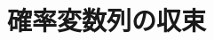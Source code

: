 \documentclass[a4j,11pt]{jarticle}
\theoremstyle{definition}
\newtheorem{lemma}[theorem]{補題}
\begin{document}
\section{確率変数列の収束}
\begin{comment} %
\begin{lemma}
  確率変数列列
  $(X_n)_{n=1}^{\infty}$
  が
  確率変数
  $X$
  に法則収束することと、分布関数列
  $(F_{X_n})_{n=1}^{\infty}$
  が
  $F_X$
  に各点収束することは同値である。
\end{lemma}
\begin{proof}
  (1)必要性

  $(X_n)_{n=1}^{\infty}$
  が
  $X$
  に法則収束すると仮定する。
  $\mathbb{E}[f(X)] = \int_{\mathbb{R}}f(x) P_X(dx)$
  となるので、
  $\lim_{n\to\infty} \int_{\mathbb{R}} f(x) P_{X_n}(dx) = \int_{\mathbb{R}} f(x) P_X(dx)$
  となる。
  $A \in \mathcal{O}(\mathbb{R})$
  とすると、
  $g_k \in C_b(\mathbb{R}) \nearrow 1_A$
  となる関数列
  $(g_k)_{k=1}^{\infty}$
  が存在する。
  $\int_{\mathbb{R}} 1_A(x) P_{X_n}(dx) = P_{X_n}(A) \geq \int_{\mathbb{R}} g_k(x) P_{X_n}(dx)$
  なので、仮定より
  $\liminf_{n\to\infty} P_{X_n}(dx) \geq \liminf_{n\to\infty} \int_{\mathbb{R}} g_k(x) P_{X_n}(dx) = \int_{\mathbb{R}} g_k(x) P_X(dx)$
  が成り立つ。
  単調収束定理より
  $\lim_{k\to\infty} \int_{\mathbb{R}} g_k(x) P_X(dx) = \int_\mathbb{R} 1_A(x)P_X(dx) = P(A)$
  が成り立つので、
  \begin{equation} \label{eq:inf}
    \liminf_{n\to\infty} P_{X_n}(A) \geq P(A)
  \end{equation}
  となる。
  また、
  $B = A^c$
  とすると、
  $\limsup_{n\to\infty} P_{X_n}(B) = \limsup_{n\to\infty} 1-P_{X_n}(A) = 1 - \liminf_{n\to\infty}P_{X_n}(A) \leq 1 - P_X(A) = P_X(B)$
  が成り立つ。
  よって、任意の
  $B \in \mathcal{O}(\mathbb{R})^c$
  に対し、
  \begin{equation} \label{eq:inf}
    \limsup_{n\to\infty} P_{X_n}(B) \leq P_X(B)
  \end{equation}
  となることがわかる。
  以上より、任意の
  $t \in \mathbb{R}$
  に対し、
  \begin{align}
    \limsup_{n\to\infty} F_{X_n}(t) \\
    & = \limsup_{n\to\infty} P_{X_n}((-\infty, t]) 
    & \leq P_X((-\infty, t]) \\
    & = F_X(t) \\
    & = P_X
  \end{align}%
  $\lim_{n\to\infty} \int_{\mathbb{R}} 1_A(x) P_{X_n}(dx) = \lim_{n\to\infty} P_{X_n}(A)$,
  $\int_{\mathbb{R}} 1_A(x) P_X(dx) = P_X(A)$
  となる。
  よって、
  $\lim_{n\to\infty} P_{X_n}(A) = P_X(A)$
  であるので、
  $\lim_{n\to\infty} F_{X_n} = F_X$
  とわかる。


\end{comment}
\end{document}
